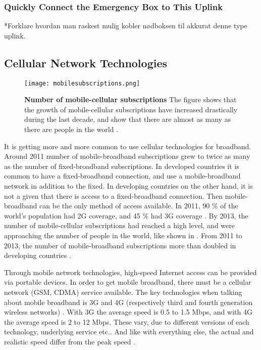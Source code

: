 \subsubsection{Quickly Connect the Emergency Box to This Uplink}
*Forklare hvordan man raskest mulig kobler nødboksen til akkurat denne type uplink.

\subsection{Cellular Network Technologies}

\begin{figure}[b]
  \centering
      \texttt{[image: mobilesubscriptions.png]}
  \caption [Number of mobile-cellular subscriptions]{\textbf{Number of mobile-cellular subscriptions} The figure shows that the growth of mobile-cellular subscriptions have increased drastically during the last decade, and show that there are almost as many as there are people in the world \cite{itu2013}.}
  \label{fig:subscribers}
\end{figure}

It is getting more and more common to use cellular technologies for broadband. Around 2011 number of mobile-broadband subscriptions grew to twice as many as the number of fixed-broadband subscriptions. In developed countries it is common to have a fixed-broadband connection, and use a mobile-broadband network in addition to the fixed. In developing countries on the other hand, it is not a given that there is access to a fixed-broadband connection. Then mobile-broadband can be the only method of access available. In 2011, 90 \% of the world's population had 2G coverage, and 45 \% had 3G coverage \cite{itu2011}. By 2013, the number of mobile-cellular subscriptions had reached a high level, and were approaching the number of people in the world, like shown in . From 2011 to 2013, the number of mobile-broadband  subscriptions more than doubled in developing countries \cite{itu2013}. 

Through mobile network technologies, high-speed Internet access can be provided via portable devices. In order to get mobile broadband, there must be a cellular network (GSM, CDMA) service available. The key technologies when talking about mobile broadband is 3G and 4G (respectively third and fourth generation wireless networks) \cite{mobilebroadband}. With 3G the average speed is 0.5 to 1.5 Mbps, and with 4G the average speed is 2 to 12 Mbps. These vary, due to different versions of each technology, underlying service etc.. And like with everything else, the actual and realistic speed differ from the peak speed \cite{3gvs4g}. 

